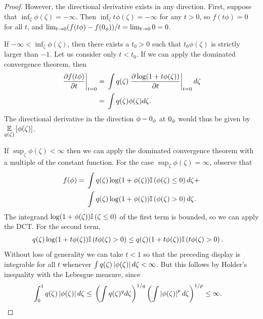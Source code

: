 \begin{lem}
\begin{proof}
However, the directional derivative exists in any direction. First, suppose that
$\inf_{\zeta} \phi(\zeta) = -\infty$.  Then $\inf_{\zeta} t \phi(\zeta) =
-\infty$ for any $t > 0$, so $f(t\phi) = 0$ for all $t$, and $\lim_{t
\rightarrow 0} (f(t \phi) - f(0_\phi)) / t = \lim_{t \rightarrow 0} 0 = 0$.

If $-\infty < \inf_\zeta \phi(\zeta)$, then there exists a $t_0 > 0$ such that
$t_0 \phi(\zeta)$ is strictly larger than $-1$.  Let us consider only $t < t_0$.
If we can apply the dominated convergence theorem, then
%
\begin{align*}
%
\fracat{\partial f(t \phi)}{\partial t}{t=0} ={}&
    \int \q(\zeta) \fracat{\partial \log(1 + t \phi(\zeta))}{\partial t}{t=0} d\zeta
\\={}&
\int \q(\zeta) \phi(\zeta) d\zeta.
%
\end{align*}
%
The directional derivative in the direction $\phi - 0_\phi$ at $0_\phi$ would thus
be given by $\underset{q(\zeta)}{\mathbb{E}}\left[\phi(\zeta)\right]$.

If $\sup_\zeta \phi(\zeta) < \infty$ then we can apply the dominated convergence
theorem with a multiple of the constant function.  For the case $\sup_\zeta
\phi(\zeta) = \infty$, observe that
%
\begin{align*}
%
f(\phi) ={}&
    \int \q(\zeta) \log(1 + \phi(\zeta)) \ind{\phi(\zeta) \le 0} d\zeta + \\
    &\int \q(\zeta) \log(1 + \phi(\zeta)) \ind{\phi(\zeta) > 0} d\zeta.
%
\end{align*}
%
The integrand $\log(1 + \phi(\zeta)) \mathbb{I}\left(\zeta \le 0\right)$ of the first term
is bounded, so we can apply the DCT.  For the second term,
%
\begin{align*}
%
\q(\zeta) \log(1 + t \phi(\zeta)) \ind{t \phi(\zeta) > 0}   \le{}&
    \q(\zeta) (1 + t \phi(\zeta)) \ind{t \phi(\zeta) > 0}.%
\end{align*}
%
Without loss of generality we can take $t < 1$ so that the preceding display is
integrable for all $t$ whenever $\int q(\zeta) \left|\phi(\zeta)\right| d\zeta <
\infty$. But this follows by Holder's inequality with the Lebesgue measure,
since
%
\begin{align*}
%
\int_0^1 \q(\zeta) \abs{\phi(\zeta)} d \zeta \le{}&
    \left( \int \q(\zeta)^q d\zeta \right)^{1/q}
    \left( \int \abs{\phi(\zeta)}^p d\zeta \right)^{1/p} \le \infty.
%
\end{align*}
%
%
\end{proof}
%
\end{lem}



